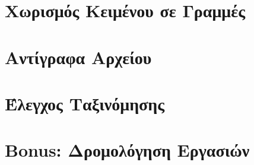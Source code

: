 \documentclass[a4paper,10pt]{article} \usepackage{anysize}
\begin{document}

\vspace{3cm}

\section{Χωρισμός Κειμένου σε Γραμμές}


\vspace{3cm}

\section{Αντίγραφα Αρχείου}


\vspace{3cm}

\section{Έλεγχος Ταξινόμησης}


\vspace{3cm}

\section{Bonus: Δρομολόγηση Εργασιών}

\end{document}
